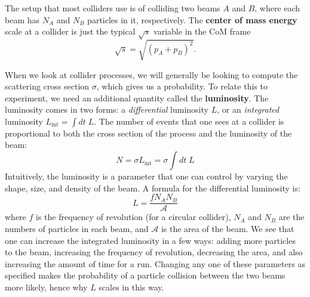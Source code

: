 \documentclass[11pt, oneside]{article}   	%
\theoremstyle{definition}
\numberwithin{equation}{subsection}		%
\begin{document}
The setup that most colliders use is of colliding two beams $A$ and $B$, where each beam has $N_A$ and $N_B$ particles in it, respectively. 
The \textbf{center of mass energy} scale at a collider is just the typical $\sqrt s$ variable in the CoM frame
\begin{equation}
	\sqrt s = \sqrt{(p_A + p_B)^2}.
\end{equation}

When we look at collider processes, we will generally be looking to compute the scattering cross section $\sigma$, which gives us a 
probability. To relate this to experiment, we need an additional quantity called the \textbf{luminosity}. The luminosity comes in two 
forms: a \textit{differential} luminosity $L$, or an \textit{integrated} luminosity $L_\mathrm{int} = \int dt\; L$. The number of events that 
one sees at a collider is proportional to both the cross section of the process and the luminosity of the beam:
\begin{equation}
	N = \sigma L_\mathrm{int} = \sigma\int dt\; L
\end{equation}
Intuitively, the luminosity is a parameter that one can control by varying the shape, size, and density of the beam. A formula for the differential 
luminosity is:
\begin{equation}
	L = \frac{f N_A N_B}{\mathcal A}
\end{equation}
where $f$ is the frequency of revolution (for a circular collider), $N_A$ and $N_B$ are the numbers of particles in each beam, and 
$\mathcal A$ is the area of the beam. We see that one can increase the integrated luminosity in a few ways: adding more particles to the 
beam, increasing the frequency of revolution, decreasing the area, and also increasing the amount of time for a run. Changing any one of 
these parameters as specified makes the probability of a particle collision between the two beams more likely, hence why $L$ scales in this 
way. 
\end{document}
